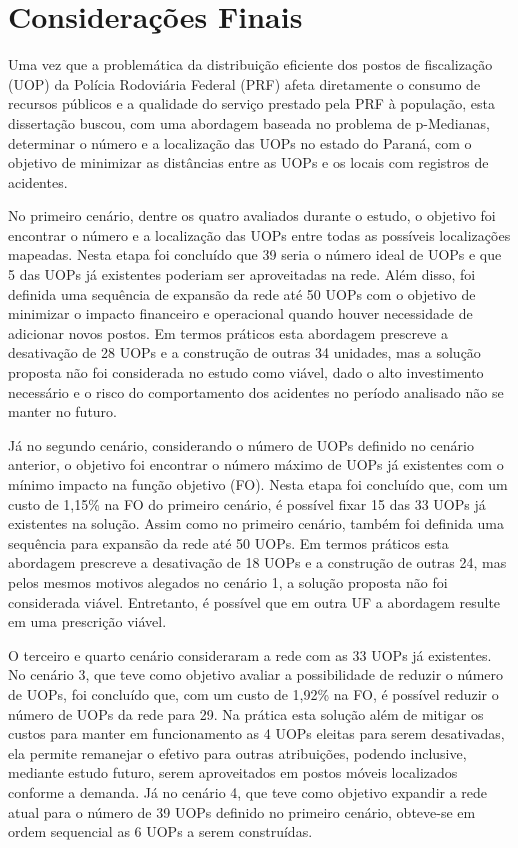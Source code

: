 \chapter{Considerações Finais}

Uma vez que a problemática da distribuição eficiente dos postos de fiscalização (UOP) da Polícia Rodoviária Federal (PRF) afeta diretamente o consumo de recursos públicos e a qualidade do serviço prestado pela PRF à população, esta dissertação buscou, com uma abordagem baseada no problema de p-Medianas, determinar o número e a localização das UOPs no estado do Paraná, com o objetivo de minimizar as distâncias entre as UOPs e os locais com registros de acidentes.

No primeiro cenário, dentre os quatro avaliados durante o estudo, o objetivo foi encontrar o número e a localização das UOPs entre todas as possíveis localizações mapeadas. Nesta etapa foi concluído que 39 seria o número ideal de UOPs e que 5 das UOPs já existentes poderiam ser aproveitadas na rede. Além disso, foi definida uma sequência de expansão da rede até 50 UOPs com o objetivo de minimizar o impacto financeiro e operacional quando houver necessidade de adicionar novos postos. Em termos práticos esta abordagem prescreve a desativação de 28 UOPs e a construção de outras 34 unidades, mas a solução proposta não foi considerada no estudo como viável, dado o alto investimento necessário e o risco do comportamento dos acidentes no período analisado não se manter no futuro. 

Já no segundo cenário, considerando o número de UOPs definido no cenário anterior, o objetivo foi encontrar o número máximo de UOPs já existentes com o mínimo impacto na função objetivo (FO). Nesta etapa foi concluído que, com um custo de 1,15\% na FO do primeiro cenário, é possível fixar 15 das 33 UOPs já existentes na solução. Assim como no primeiro cenário, também foi definida uma sequência para expansão da rede até 50 UOPs. Em termos práticos esta abordagem prescreve a desativação de 18 UOPs e a construção de outras 24, mas pelos mesmos motivos alegados no cenário 1, a solução proposta não foi considerada viável. Entretanto, é possível que em outra UF a abordagem resulte em uma prescrição viável.

O terceiro e quarto cenário consideraram a rede com as 33 UOPs já existentes. No cenário 3, que teve como objetivo avaliar a possibilidade de reduzir o número de UOPs, foi concluído que, com um custo de 1,92\% na FO, é possível reduzir o número de UOPs da rede para 29. Na prática esta solução além de mitigar os custos para manter em funcionamento as 4 UOPs eleitas para serem desativadas, ela permite remanejar o efetivo para outras atribuições, podendo inclusive, mediante estudo futuro, serem aproveitados em postos móveis localizados conforme a demanda. Já no cenário 4, que teve como objetivo expandir a rede atual para o número de 39 UOPs definido no primeiro cenário, obteve-se em ordem sequencial as 6 UOPs a serem construídas.

